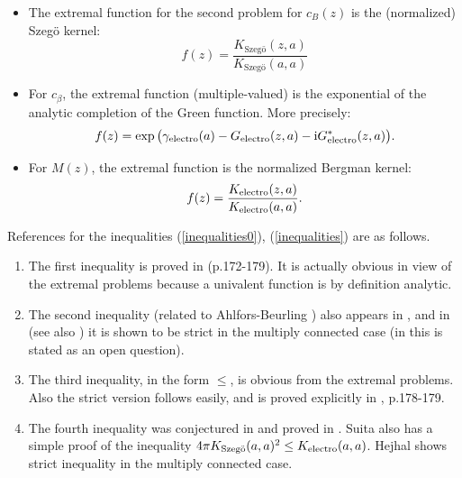 \documentclass[reqno,12pt]{article}
\theoremstyle{plain}
\theoremstyle{definition}
\numberwithin{equation}{section}
\numberwithin{figure}{section}
\def\I{\mathrm{i}}
\begin{document}
\begin{itemize}
\item The extremal function for the second problem for $c_B(z)$ is the (normalized) Szeg\"o kernel:
\begin{equation}\label{KLSzego}
f(z)=\frac{K_\text{Szeg\"o}(z,a)}{K_\text{Szeg\"o}(a,a)}
\end{equation}
\item For $c_\beta$, the extremal function (multiple-valued) is the exponential of the analytic completion of the Green function. More precisely:
\begin{equation}\label{fKSzego}
f(z)=\exp\big(\gamma_{\rm electro}(a) -G_{\rm electro}(z,a)-\I G_{\rm electro}^*(z,a)  \big). 
\end{equation}
\item For $M(z)$, the extremal function is the normalized Bergman kernel:
\begin{equation}\label{fKelectro}
f(z)=\frac{K_{\rm electro}(z,a)}{K_{\rm electro}(a,a)}.
\end{equation}
\end{itemize}

References for the inequalities (\ref{inequalities0}), (\ref{inequalities}) are as follows.
\begin{enumerate}

\item The first inequality is proved in \cite{Sario-Oikawa-1969} (p.172-179). It is actually obvious in view of the extremal problems
because a univalent function is by definition analytic.

\item The second inequality (related to Ahlfors-Beurling \cite{Ahlfors-Beurling-1950}) also appears in \cite{Sario-Oikawa-1969},
and in \cite{Sakai-1969} (see also \cite{Sakai-1982}) it is shown to be strict in the multiply connected case (in \cite{Sario-Oikawa-1969} 
this is stated as an open question).

\item The third inequality, in the form $\leq$, is obvious from the extremal problems. Also the strict version follows easily, and is proved explicitly in \cite{Sario-Oikawa-1969}, p.178-179.

\item The fourth inequality was conjectured in \cite{Suita-1972} and proved in \cite{Berndtsson-Lempert-2016}. 
Suita \cite{Suita-1972} also has a simple proof of the inequality $4\pi K_\text{Szeg\"o}(a,a)^2\leq K_{\rm electro}(a,a)$.
Hejhal \cite{Hejhal-1972} shows strict inequality in the multiply connected case.

\end{enumerate}






\end{document}
